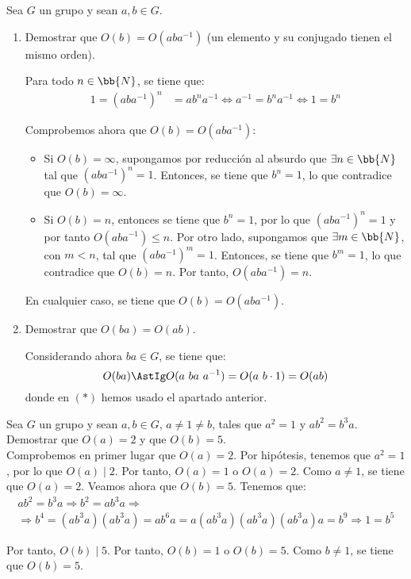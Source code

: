 \begin{ejercicio}\label{ej:2.33}
    Sea $G$ un grupo y sean $a, b \in G$.
    \begin{enumerate}
        \item Demostrar que $O(b) = O(aba^{-1})$ (un elemento y su conjugado tienen el mismo orden).
        
        Para todo $n\in \bb{N}$, se tiene que:
        \begin{align*}
            1=(aba^{-1})^n&=ab^n a^{-1}\iff a^{-1}=b^n a^{-1}\iff 1=b^n
        \end{align*}

        Comprobemos ahora que $O(b)=O(aba^{-1})$:
        \begin{itemize}
            \item Si $O(b)=\infty$, supongamos por reducción al absurdo que $\exists n\in \bb{N}$ tal que $(aba^{-1})^n=1$. Entonces, se tiene que $b^n=1$, lo que contradice que $O(b)=\infty$.
            
            \item Si $O(b)=n$, entonces se tiene que $b^n=1$, por lo que $(aba^{-1})^n=1$ y por tanto $O(aba^{-1})\leq n$. Por otro lado, supongamos que $\exists m\in \bb{N}$, con $m<n$, tal que $(aba^{-1})^m=1$. Entonces, se tiene que $b^m=1$, lo que contradice que $O(b)=n$. Por tanto, $O(aba^{-1})=n$.
        \end{itemize}

        En cualquier caso, se tiene que $O(b)=O(aba^{-1})$.
        \item Demostrar que $O(ba) = O(ab)$.
        
        Considerando ahora $ba\in G$, se tiene que:
        \begin{equation*}
            O(ba) \AstIg O(a\ ba\ a^{-1}) = O(a\ b\cdot 1)=O(ab)
        \end{equation*}
        donde en $(\ast)$ hemos usado el apartado anterior.
    \end{enumerate}
\end{ejercicio}

\begin{ejercicio}\label{ej:2.34}
    Sea $G$ un grupo y sean $a, b \in G$, $a \neq 1 \neq b$, tales que $a^2 = 1$ y $ab^2 = b^3a$. Demostrar que $O(a) = 2$ y que $O(b) = 5$.\\

    Comprobemos en primer lugar que $O(a)=2$. Por hipótesis, tenemos que $a^2=1$, por lo que $O(a)\mid 2$. Por tanto, $O(a)=1$ o $O(a)=2$. Como $a\neq 1$, se tiene que $O(a)=2$. Veamos ahora que $O(b)=5$. Tenemos que:
    \begin{multline*}
        ab^2 = b^3a
        \Longrightarrow
        b^2=ab^3a
        \Longrightarrow \\ \Longrightarrow
        b^4=(ab^3a)(ab^3a)=ab^6a=a(ab^3a)(ab^3a)(ab^3a)a
        =b^9\Longrightarrow 1=b^5
    \end{multline*}

    Por tanto, $O(b)\mid 5$. Por tanto, $O(b)=1$ o $O(b)=5$. Como $b\neq 1$, se tiene que $O(b)=5$.
\end{ejercicio}

